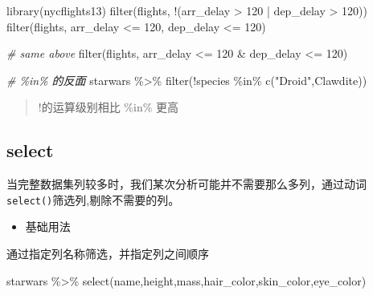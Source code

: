\documentclass[
]{book}
\newenvironment{Shaded}{\begin{snugshade}}{\end{snugshade}}
\newcommand{\CommentTok}[1]{\textcolor[rgb]{0.56,0.35,0.01}{\textit{#1}}}
\newcommand{\DecValTok}[1]{\textcolor[rgb]{0.00,0.00,0.81}{#1}}
\newcommand{\FunctionTok}[1]{\textcolor[rgb]{0.00,0.00,0.00}{#1}}
\newcommand{\NormalTok}[1]{#1}
\newcommand{\SpecialCharTok}[1]{\textcolor[rgb]{0.00,0.00,0.00}{#1}}
\newcommand{\StringTok}[1]{\textcolor[rgb]{0.31,0.60,0.02}{#1}}
\providecommand{\tightlist}{%
  \setlength{\itemsep}{0pt}\setlength{\parskip}{0pt}}
\begin{document}
\begin{Shaded}
\begin{Highlighting}[]
\FunctionTok{library}\NormalTok{(nycflights13)}
\FunctionTok{filter}\NormalTok{(flights, }\SpecialCharTok{!}\NormalTok{(arr\_delay }\SpecialCharTok{\textgreater{}} \DecValTok{120} \SpecialCharTok{|}\NormalTok{ dep\_delay }\SpecialCharTok{\textgreater{}} \DecValTok{120}\NormalTok{))}
\FunctionTok{filter}\NormalTok{(flights, arr\_delay }\SpecialCharTok{\textless{}=} \DecValTok{120}\NormalTok{, dep\_delay }\SpecialCharTok{\textless{}=} \DecValTok{120}\NormalTok{)}

\CommentTok{\# same above}
\FunctionTok{filter}\NormalTok{(flights, arr\_delay }\SpecialCharTok{\textless{}=} \DecValTok{120} \SpecialCharTok{\&}\NormalTok{ dep\_delay }\SpecialCharTok{\textless{}=} \DecValTok{120}\NormalTok{)}

\CommentTok{\# \%in\% 的反面}
\NormalTok{starwars }\SpecialCharTok{\%\textgreater{}\%} 
  \FunctionTok{filter}\NormalTok{(}\SpecialCharTok{!}\NormalTok{species }\SpecialCharTok{\%in\%}  \FunctionTok{c}\NormalTok{(}\StringTok{"Droid"}\NormalTok{,}\StringTok{\textquotesingle{}Clawdite\textquotesingle{}}\NormalTok{))}
\end{Highlighting}
\end{Shaded}

\begin{quote}
!的运算级别相比 \%in\% 更高
\end{quote}

\hypertarget{dplyr-select}{%
\subsection{select}\label{dplyr-select}}

当完整数据集列较多时，我们某次分析可能并不需要那么多列，通过动词\texttt{select()}筛选列,剔除不需要的列。

\begin{itemize}
\tightlist
\item
  基础用法
\end{itemize}

通过指定列名称筛选，并指定列之间顺序

\begin{Shaded}
\begin{Highlighting}[]
\NormalTok{starwars }\SpecialCharTok{\%\textgreater{}\%} 
  \FunctionTok{select}\NormalTok{(name,height,mass,hair\_color,skin\_color,eye\_color)}
\end{Highlighting}
\end{Shaded}
\end{document}
